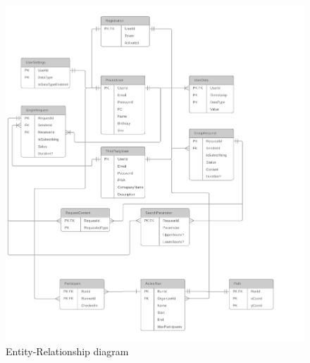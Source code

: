 \documentclass[titlepage]{article}
\begin{document}
\begin{figure}[H]
	\center
  	\includegraphics[width=15cm]{ER.png}
  	\caption{Entity-Relationship diagram}
 	\label{fig:ER}
\end{figure}

\pagebreak

\end{document}
